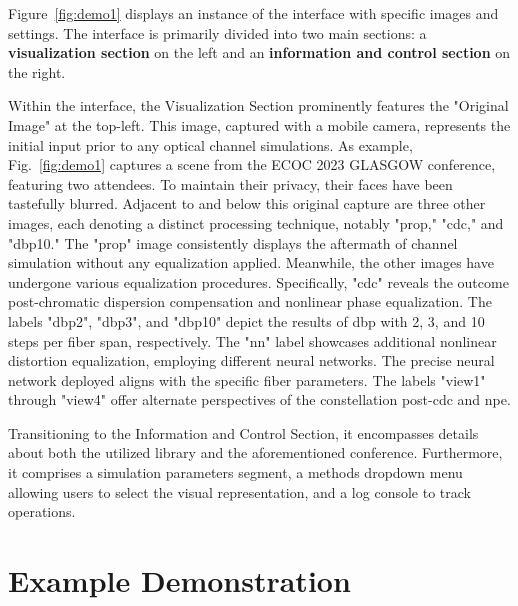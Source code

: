 Figure~\ref{fig:demo1} displays an instance of the interface with specific images and settings. The interface is primarily divided into two main sections: a \textbf{visualization section} on the left and an \textbf{information and control section} on the right.

Within the interface, the Visualization Section prominently features the "Original Image" at the top-left. This image, captured with a mobile camera, represents the initial input prior to any optical channel simulations. As example, Fig.~\ref{fig:demo1} captures a scene from the ECOC 2023 GLASGOW conference, featuring two attendees. To maintain their privacy, their faces have been tastefully blurred. Adjacent to and below this original capture are three other images, each denoting a distinct processing technique, notably "prop," "cdc," and "dbp10." The "prop" image consistently displays the aftermath of channel simulation without any equalization applied. Meanwhile, the other images have undergone various equalization procedures. Specifically, "cdc" reveals the outcome post-chromatic dispersion compensation and nonlinear phase equalization. The labels "dbp2", "dbp3", and "dbp10" depict the results of \gls{dbp} with 2, 3, and 10 steps per fiber span, respectively. The "nn" label showcases additional nonlinear distortion equalization, employing different neural networks. The precise neural network deployed aligns with the specific fiber parameters. The labels "view1" through "view4" offer alternate perspectives of the constellation post-\gls{cdc} and \gls{npe}.

Transitioning to the Information and Control Section, it encompasses details about both the utilized library and the aforementioned conference. Furthermore, it comprises a simulation parameters segment, a methods dropdown menu allowing users to select the visual representation, and a log console to track operations.


\section{Example Demonstration}

